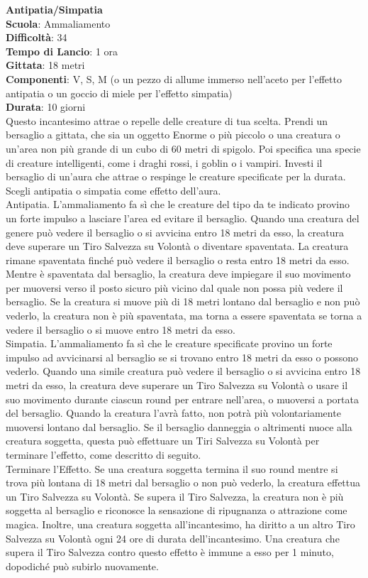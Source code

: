\begin{multicols}{2}
\medskip\textbf{Antipatia/Simpatia}\\
\textbf{Scuola}: Ammaliamento\\
\textbf{Difficoltà}: 34\\
\textbf{Tempo di Lancio}: 1 ora\\
\textbf{Gittata}: 18 metri\\
\textbf{Componenti}: V, S, M (o un pezzo di allume immerso nell'aceto per l'effetto antipatia o un goccio di miele per l'effetto simpatia)\\
\textbf{Durata}: 10 giorni\\
Questo incantesimo attrae o repelle delle creature di tua scelta. Prendi un bersaglio a gittata, che sia un oggetto Enorme o più piccolo o una creatura o un'area non più grande di un cubo di 60 metri di spigolo. Poi specifica una specie di creature intelligenti, come i draghi rossi, i goblin o i vampiri. Investi il bersaglio di un'aura che attrae o respinge le creature specificate per la durata. Scegli antipatia o simpatia come effetto dell'aura.\\
Antipatia. L'ammaliamento fa sì che le creature del tipo da te indicato provino un forte impulso a lasciare l'area ed evitare il bersaglio. Quando una creatura del genere può vedere il bersaglio o si avvicina entro 18 metri da esso, la creatura deve superare un Tiro Salvezza su Volontà o diventare spaventata. La creatura rimane spaventata finché può vedere il bersaglio o resta entro 18 metri da esso. Mentre è spaventata dal bersaglio, la creatura deve impiegare il suo movimento per muoversi verso il posto sicuro più vicino dal quale non possa più vedere il bersaglio. Se la creatura si muove più di 18 metri lontano dal bersaglio e non può vederlo, la creatura non è più spaventata, ma torna a essere spaventata se torna a vedere il bersaglio o si muove entro 18 metri da esso.\\
Simpatia. L'ammaliamento fa sì che le creature specificate provino un forte impulso ad avvicinarsi al bersaglio se si trovano entro 18 metri da esso o possono vederlo. Quando una simile creatura può vedere il bersaglio o si avvicina entro 18 metri da esso, la creatura deve superare un Tiro Salvezza su Volontà o usare il suo movimento durante ciascun round per entrare nell'area, o muoversi a portata del bersaglio. Quando la creatura l'avrà fatto, non potrà più volontariamente muoversi lontano dal bersaglio. Se il bersaglio danneggia o altrimenti nuoce alla creatura soggetta, questa può effettuare un Tiri Salvezza su Volontà per terminare l'effetto, come descritto di seguito.\\
Terminare l'Effetto. Se una creatura soggetta termina il suo round mentre si trova più lontana di 18 metri dal bersaglio o non può vederlo, la creatura effettua un Tiro Salvezza su Volontà. Se supera il Tiro Salvezza, la creatura non è più soggetta al bersaglio e riconosce la sensazione di ripugnanza o attrazione come magica. Inoltre, una creatura soggetta all'incantesimo, ha diritto a un altro Tiro Salvezza su Volontà ogni 24 ore di durata dell'incantesimo. Una creatura che supera il Tiro Salvezza contro questo effetto è immune a esso per 1 minuto, dopodiché può subirlo nuovamente.


\end{multicols}
